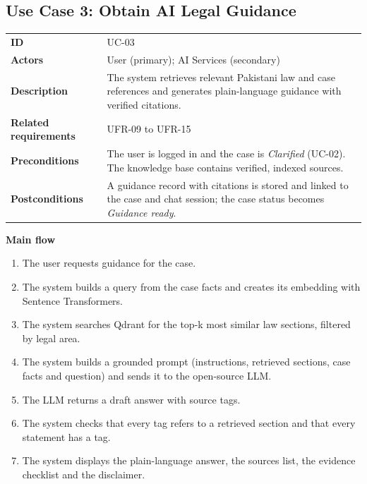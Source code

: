 \subsection{Use Case 3: Obtain AI Legal Guidance}

\begin{center}
\begin{tabular}{|L{2.66cm}|L{12.27cm}|}
\hline\headrow {} &  \\ \hline
\textbf{ID} & UC-03 \\ \hline
\textbf{Actors} & User (primary); AI Services (secondary) \\ \hline
\textbf{Description} & The system retrieves relevant Pakistani law and case references and generates plain-language guidance with verified citations. \\ \hline
\textbf{Related requirements} & UFR-09 to UFR-15 \\ \hline
\textbf{Preconditions} & The user is logged in and the case is \emph{Clarified} (UC-02). The knowledge base contains verified, indexed sources. \\ \hline
\textbf{Postconditions} & A guidance record with citations is stored and linked to the case and chat session; the case status becomes \emph{Guidance ready}. \\ \hline
\end{tabular}
\end{center}

\textbf{Main flow}

\begin{enumerate}
  \item The user requests guidance for the case.
  \item The system builds a query from the case facts and creates its embedding with Sentence Transformers.
  \item The system searches Qdrant for the top-k most similar law sections, filtered by legal area.
  \item The system builds a grounded prompt (instructions, retrieved sections, case facts and question) and sends it to the open-source LLM.
  \item The LLM returns a draft answer with source tags.
  \item The system checks that every tag refers to a retrieved section and that every statement has a tag.
  \item The system displays the plain-language answer, the sources list, the evidence checklist and the disclaimer.
\end{enumerate}

